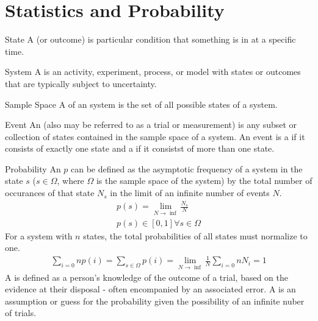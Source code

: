 \chapter{Statistics and Probability}
\thispagestyle{fancy}

\begin{defn}[State]{State}
A  (or outcome) is particular condition that something is in at a specific time.
\end{defn}

\begin{defn}[System]{System}
A  is an activity, experiment, process, or model with states or outcomes that are typically subject to uncertainty.
\end{defn}

\begin{defn}{Sample Space}
A  of an system is the set of all possible states of a system.
\end{defn}

\begin{defn}[Event]{Event}
An  (also may be referred to as a trial or measurement) is any subset or collection of states contained in the sample space of a system. An event is a  if it consists of exactly one state and a  if it consistst of more than one state.
\end{defn}

\begin{defn}[Probability]{Probability}
An  $p$ can be defined as the asymptotic frequency of a system in the state $s$ ($s \in \Omega$, where $\Omega$ is the sample space of the system) by the total number of occurances of that state $N_s$ in the limit of an infinite number of events $N$.
    \begin{align}
        p(s) = \lim_{N\rightarrow\inf}\frac{N_s}{N} \\
	p(s) \in [0,1] \forall s \in \Omega
    \end{align}
For a system with $n$ states, the total probabilities of all states must normalize to one.
    \begin{align}
        \sum_{i=0}{n}p(i) = \sum_{s \in \Omega}p(i) = \lim_{N\rightarrow\inf}\frac{1}{N}\sum_{i=0}{n}N_i = 1
    \end{align}
A  is defined as a person's knowledge of the outcome of a trial, based on the evidence at their disposal - often encompanied by an associated error. A  is an assumption or guess for the probability given the possibility of an infinite nuber of trials.
\end{defn}

